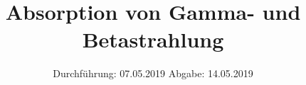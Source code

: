 

\subject{V704}
\title{Absorption von Gamma- und Betastrahlung}
\date{%
  Durchführung: 07.05.2019
  \hspace{3em}
  Abgabe: 14.05.2019
}



\maketitle
\thispagestyle{empty}
\tableofcontents
\newpage






\printbibliography{}


